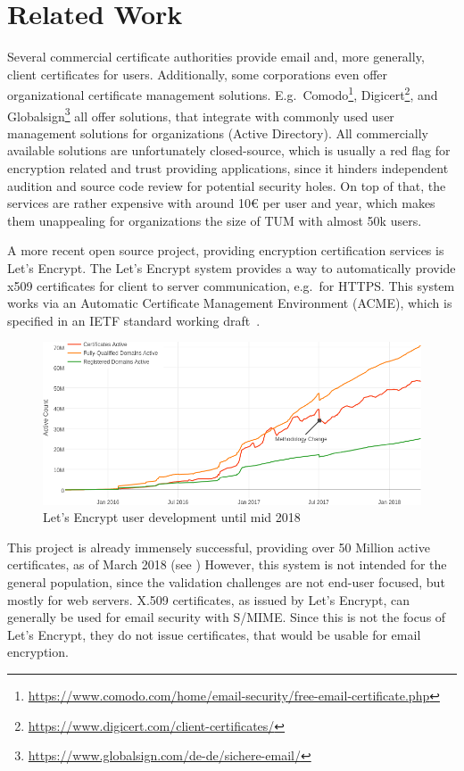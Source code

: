 \chapter{Related Work}\label{ch:relatedWork}
Several commercial certificate authorities provide email and, more generally, client certificates for users.
Additionally, some corporations even offer organizational certificate management solutions.
E.g.\ Comodo\footnote{\url{https://www.comodo.com/home/email-security/free-email-certificate.php}},
Digicert\footnote{\url{https://www.digicert.com/client-certificates/}}, and
Globalsign\footnote{\url{https://www.globalsign.com/de-de/sichere-email/}} all offer solutions, that integrate with
commonly used user management solutions for organizations (Active Directory).
All commercially available solutions are unfortunately closed-source, which is usually a red flag for encryption related
and trust providing applications, since it hinders independent audition and source code review for potential security
holes.
On top of that, the services are rather expensive with around 10€ per user and year, which makes them unappealing for
organizations the size of TUM with almost 50k users.

A more recent open source project, providing encryption certification services is Let's Encrypt.
The Let's Encrypt system provides a way to automatically provide x509 certificates for client to server communication,
e.g.\ for HTTPS\@.
This system works via an Automatic Certificate Management Environment (ACME), which is specified in an IETF standard
working draft~\cite{letsencrypteacme}.

\begin{figure}[hb]
    \centering
    \includegraphics[width=.905\textwidth]{figures/letsencryptusers.png}
    \caption{Let's Encrypt user development until mid 2018~\cite{letsencryptstats}}
    \label{fig:letsencrypt}
\end{figure}

This project is already immensely successful, providing over 50 Million active certificates, as of March 2018 (see
)
However, this system is not intended for the general population, since the validation challenges are not end-user
focused, but mostly for web servers.
X.509 certificates, as issued by Let's Encrypt, can generally be used for email security with S/MIME\@.
Since this is not the focus of Let's Encrypt, they do not issue certificates, that would be usable for email encryption.

